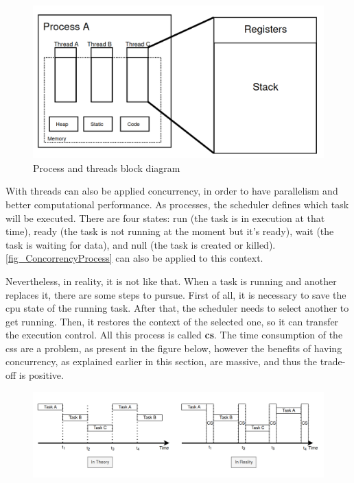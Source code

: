 \begin{figure}[H]
	\centering
 	\includegraphics[width=0.7\linewidth]{Images/ProcessAndThread.png}
 	\caption{ Process and threads block diagram }
	 \label{fig_ProcessAndThread}
\end{figure}

With threads can also be applied concurrency, in order to have parallelism and better computational performance. As processes, the scheduler defines which task will be executed. There are four states: run (the task is in execution at that time), ready (the task is not running at the moment but it’s ready), wait (the task is waiting for data), and null (the task is created or killed). \autoref{fig_ConcorrencyProcess} can also be applied to this context.

Nevertheless, in reality, it is not like that. When a task is running and another replaces it, there are some steps to pursue. First of all, it is necessary to save the \gls{cpu} state of the running task. After that, the scheduler needs to select another to get running. Then, it restores the context of the selected one, so it can transfer the execution control. All this process is called \textbf{\gls{cs}}. The time consumption of the \glspl{cs} are a problem, as present in the figure below, however the benefits of having concurrency, as explained earlier in this section, are massive, and thus the trade-off is positive.

\begin{figure}[H]
	\centering
 	\includegraphics[width=1\linewidth]{Images/ContextSwitch.png}
 	\caption{  }
	 \label{fig_ContextSwitch}
\end{figure}

